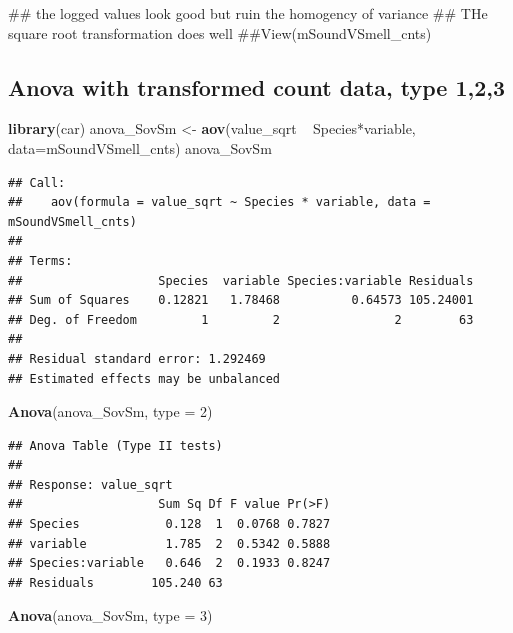 \documentclass[]{article}
\newenvironment{Shaded}{\begin{snugshade}}{\end{snugshade}}
\newcommand{\KeywordTok}[1]{\textcolor[rgb]{0.13,0.29,0.53}{\textbf{{#1}}}}
\newcommand{\DataTypeTok}[1]{\textcolor[rgb]{0.13,0.29,0.53}{{#1}}}
\newcommand{\DecValTok}[1]{\textcolor[rgb]{0.00,0.00,0.81}{{#1}}}
\newcommand{\StringTok}[1]{\textcolor[rgb]{0.31,0.60,0.02}{{#1}}}
\newcommand{\NormalTok}[1]{{#1}}
\begin{document}
\begin{Shaded}
\begin{Highlighting}[]
\NormalTok{## the logged values look good but ruin the homogency of variance}
\NormalTok{## THe square root transformation does well}
\NormalTok{##View(mSoundVSmell_cnts)}
\end{Highlighting}
\end{Shaded}

\subsection{Anova with transformed count data, type
1,2,3}\label{anova-with-transformed-count-data-type-123-1}

\begin{Shaded}
\begin{Highlighting}[]
\KeywordTok{library}\NormalTok{(car)}
\NormalTok{anova_SovSm <-}\StringTok{ }\KeywordTok{aov}\NormalTok{(value_sqrt ~}\StringTok{ }\NormalTok{Species*variable, }\DataTypeTok{data=}\NormalTok{mSoundVSmell_cnts)}
\NormalTok{anova_SovSm}
\end{Highlighting}
\end{Shaded}

\begin{verbatim}
## Call:
##    aov(formula = value_sqrt ~ Species * variable, data = mSoundVSmell_cnts)
## 
## Terms:
##                   Species  variable Species:variable Residuals
## Sum of Squares    0.12821   1.78468          0.64573 105.24001
## Deg. of Freedom         1         2                2        63
## 
## Residual standard error: 1.292469
## Estimated effects may be unbalanced
\end{verbatim}

\begin{Shaded}
\begin{Highlighting}[]
\KeywordTok{Anova}\NormalTok{(anova_SovSm, }\DataTypeTok{type =} \DecValTok{2}\NormalTok{)}
\end{Highlighting}
\end{Shaded}

\begin{verbatim}
## Anova Table (Type II tests)
## 
## Response: value_sqrt
##                   Sum Sq Df F value Pr(>F)
## Species            0.128  1  0.0768 0.7827
## variable           1.785  2  0.5342 0.5888
## Species:variable   0.646  2  0.1933 0.8247
## Residuals        105.240 63
\end{verbatim}

\begin{Shaded}
\begin{Highlighting}[]
\KeywordTok{Anova}\NormalTok{(anova_SovSm, }\DataTypeTok{type =} \DecValTok{3}\NormalTok{)}
\end{Highlighting}
\end{Shaded}
\end{document}
